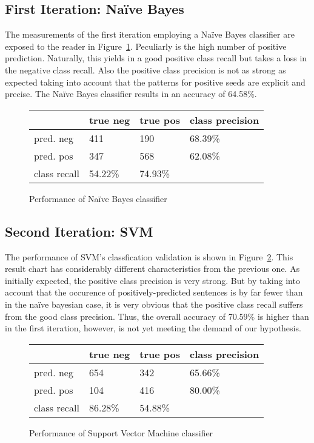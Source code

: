 \documentclass[11pt,titlepage,oneside,openany]{book}
\begin{document}

\subsection{First Iteration: Na\"{i}ve Bayes}
\label{sec:nb}

The measurements of the first iteration employing a Na\"{i}ve Bayes classifier are exposed to the reader in Figure~\ref{fig.nb}. Peculiarly is the high number of positive prediction. Naturally, this yields in a good positive class recall but takes a loss in the negative class recall. Also the positive class precision is not as strong as expected taking into account that the patterns for positive seeds are explicit and precise. The Na\"{i}ve Bayes classifier results in an accuracy of 64.58\%.

\begin{figure} [h!]
\centering
\begin{tabular}{ | l | l | l | l | }
\hline
	 & true neg & true pos & class precision \\ \hline
	pred. neg & 411 & 190 & 68.39\% \\ \hline
	pred. pos & 347 & 568 & 62.08\% \\ \hline
	class recall & 54.22\% & 74.93\% &  \\ \hline
\end{tabular}
\caption{Performance of Na\"{i}ve Bayes classifier}
\label{fig.nb}
\end{figure}


\subsection{Second Iteration: SVM}
\label{sec:svm}

The performance of SVM's classfication validation is shown in Figure~\ref{fig.svm}. This result chart has considerably different characteristics from the previous one. As initially expected, the positive class precision is very strong. But by taking into account that the occurence of positively-predicted sentences is by far fewer than in the na\"{i}ve bayesian case, it is very obvious that the positive class recall suffers from the good class precision. Thus, the overall accuracy of 70.59\% is higher than in the first iteration, however, is not yet meeting the demand of our hypothesis.

\begin{figure} [h!]
\centering
\begin{tabular}{ | l | l | l | l | }
\hline
	 & true neg & true pos & class precision \\ \hline
	pred. neg & 654 & 342 & 65.66\% \\ \hline
	pred. pos & 104 & 416 & 80.00\% \\ \hline
	class recall & 86.28\% & 54.88\% &  \\ \hline
\end{tabular}
\caption{Performance of Support Vector Machine classifier}
\label{fig.svm}
\end{figure}
\end{document}
